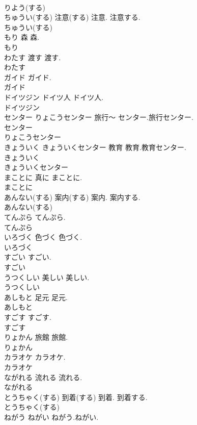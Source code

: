 \documentclass[8pt]{extreport}
\begin{document}
\begin{CJK}{UTF8}{min}
\\	りよう(する)
\\	ちゅうい(する)	注意(する)	注意. 注意する.	
\\	ちゅうい(する)
\\	もり	森	森.	
\\	もり
\\	わたす	渡す	渡す.	
\\	わたす
\\	ガイド		ガイド.	
\\	ガイド
\\	ドイツジン	ドイツ人	ドイツ人.	
\\	ドイツジン
\\	センター りょこうセンター	旅行～	センター.旅行センター.	
\\	センター
\\	りょこうセンター
\\	きょういく きょういくセンター	教育	教育.教育センター.	
\\	きょういく
\\	きょういくセンター
\\	まことに	真に	まことに.	
\\	まことに
\\	あんない(する)	案内(する)	案内. 案内する.	
\\	あんない(する)
\\	てんぷら		てんぷら.	
\\	てんぷら
\\	いろづく	色づく	色づく.	
\\	いろづく
\\	すごい		すごい.	
\\	すごい
\\	うつくしい	美しい	美しい.	
\\	うつくしい
\\	あしもと	足元	足元.	
\\	あしもと
\\	すごす		すごす.	
\\	すごす
\\	りょかん	旅館	旅館.	
\\	りょかん
\\	カラオケ		カラオケ.	
\\	カラオケ
\\	ながれる	流れる	流れる.	
\\	ながれる
\\	とうちゃく(する)	到着(する)	到着. 到着する.	
\\	とうちゃく(する)
\\	ねがう ねがい		ねがう.ねがい.	

\end{CJK}
\end{document}
